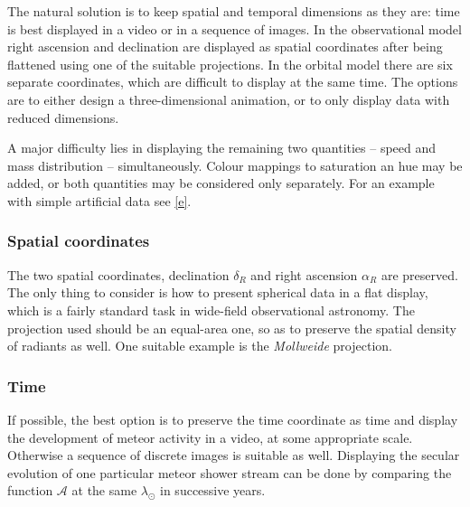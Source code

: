         The natural solution is to keep spatial and temporal dimensions as they are:
        time is best displayed in a video or in a sequence of images.
        In the observational model right ascension and declination are displayed as spatial coordinates after being
        flattened using one of the suitable projections.
        In the orbital model there are six separate coordinates, which are difficult to display at the same time.
        The options are to either design a three-dimensional animation, or to only display data with reduced dimensions.

        A major difficulty lies in displaying the remaining two quantities -- speed and mass distribution -- simultaneously.
        Colour mappings to saturation an hue may be added, or both quantities may be considered only separately.
        For an example with simple artificial data see \cref{e}.

        \subsubsection{Spatial coordinates} \label{iovs}
            The two spatial coordinates, declination $\delta_R$ and right ascension $\alpha_R$ are preserved.
            The only thing to consider is how to present spherical data in a flat display,
            which is a fairly standard task in wide-field observational astronomy.
            The projection used should be an equal-area one, so as to preserve the spatial density of radiants as well.
            One suitable example is the \emph{Mollweide} projection.


        \subsubsection{Time} \label{iovt}
            If possible, the best option is to preserve the time coordinate as time
            and display the development of meteor activity in a video, at some appropriate scale.
            Otherwise a sequence of discrete images is suitable as well.
            Displaying the secular evolution of one particular meteor shower stream can be done
            by comparing the function $\mathcal{A}$ at the same $\lambda_\odot$ in successive years.

